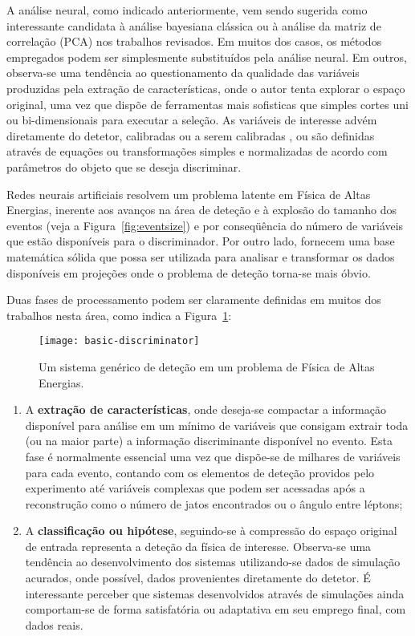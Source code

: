 A análise neural, como indicado anteriormente, vem sendo sugerida como
interessante candidata à análise bayesiana clássica ou à análise da matriz de
correlação (PCA) nos trabalhos revisados. Em muitos dos casos, os métodos
empregados podem ser simplesmente substituídos pela análise neural. Em outros,
observa-se uma tendência ao questionamento da qualidade das variáveis
produzidas pela extração de características, onde o autor tenta explorar o
espaço original, uma vez que dispõe de ferramentas mais sofisticas que simples
cortes uni ou bi-dimensionais para executar a seleção. As variáveis de
interesse advém diretamente do detetor, calibradas ou a serem calibradas
\cite{silva-acat-2001}, ou são definidas através de equações ou transformações
simples e normalizadas de acordo com parâmetros do objeto que se deseja
discriminar.

Redes neurais artificiais resolvem um problema latente em Física de Altas
Energias, inerente aos avanços na área de deteção e à explosão do tamanho dos
eventos (veja a Figura~\ref{fig:eventsize}) e por conseqüência do número de
variáveis que estão disponíveis para o discriminador. Por outro lado, fornecem
uma base matemática sólida que possa ser utilizada para analisar e transformar
os dados disponíveis em projeções onde o problema de deteção torna-se mais
óbvio.

Duas fases de processamento podem ser claramente definidas em muitos dos
trabalhos nesta área, como indica a Figura~\ref{fig:basic-discriminator}:

\begin{figure}
\begin{center}
\texttt{[image: basic-discriminator]}
\end{center}
\caption{Um sistema genérico de deteção em um problema de Física de Altas Energias.}
\label{fig:basic-discriminator}
\end{figure}

\begin{enumerate}
\item A \textbf{extração de características}, onde deseja-se compactar a
informação disponível para análise em um mínimo de variáveis que consigam
extrair toda (ou na maior parte) a informação discriminante disponível no
evento. Esta fase é normalmente essencial uma vez que dispõe-se de milhares de
variáveis para cada evento, contando com os elementos de deteção providos pelo
experimento até variáveis complexas que podem ser acessadas após a
reconstrução como o número de jatos encontrados ou o ângulo entre léptons;
\item A \textbf{classificação ou hipótese}, seguindo-se à compressão do espaço
original de entrada representa a deteção da física de interesse. Observa-se
uma tendência ao desenvolvimento dos sistemas utilizando-se dados de simulação
acurados, onde possível, dados provenientes diretamente do detetor. É
interessante perceber que sistemas desenvolvidos através de simulações ainda
comportam-se de forma satisfatória ou adaptativa em seu emprego final, com
dados reais.
\end{enumerate}

